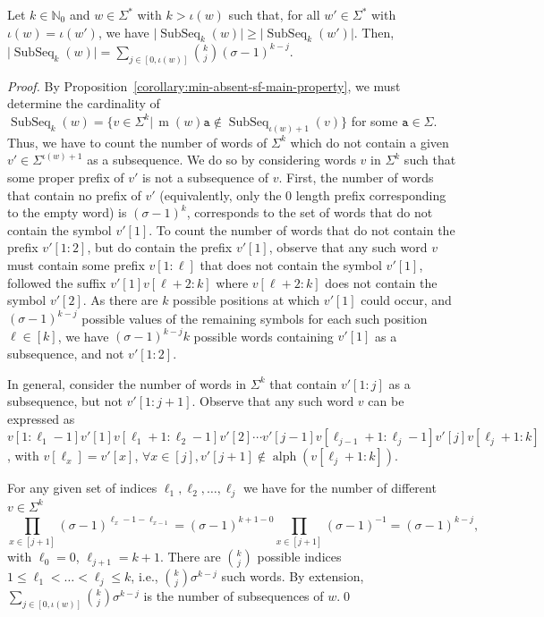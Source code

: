 \documentclass[runningheads,UKenglish,cleveref, autoref, thm-restate]{llncs}
\newcommand{\N}{\mathbb{N}}
\def\ta{\mathtt{a}}
\def\m{\operatorname{m}}
\DeclareMathOperator\ScatFact{SubSeq}
\DeclareMathOperator{\letters}{alph}
\newif\ifpaper
\begin{document}
\begin{proposition}
    \label{proposition:min-absent-sf-count-max-factors}
    Let $k\in\N_0$ and $w \in \Sigma^*$ with $k > \iota(w)$ such that, for all $w' \in \Sigma^*$ with $\iota(w) = \iota(w')$, we have $\vert \ScatFact_k(w) \vert \geq \vert \ScatFact_k(w') \vert$. Then,
    $\vert \ScatFact_k(w) \vert = \sum_{j \in [0, \iota(w)]} \binom{k}{j} (\sigma-1)^{k - j}.$
\end{proposition}
\ifpaper
\else
\begin{proof}
	By Proposition~\ref{corollary:min-absent-sf-main-property}, we must determine the cardinality of 
	$\ScatFact_k(w)=\{v\in\Sigma^k|\,\m(w)\ta\not\in\ScatFact_{\iota(w)+1}(v)\}$ for some $\ta \in \Sigma$. Thus, we have to count the number of words of $\Sigma^k$ which do not contain a given $v'\in\Sigma^{\iota(w)+1}$ as a subsequence. We do so by considering words $v$ in $\Sigma^k$ such that some proper prefix of $v'$ is not a subsequence of $v$.
	First, the number of words that contain no prefix of $v'$ (equivalently, only the $0$ length prefix corresponding to the empty word) is $(\sigma - 1)^k$, corresponds to the set of words that do not contain the symbol $v'[1]$. 
	To count the number of words that do not contain the prefix $v'[1: 2]$, but do contain the prefix $v'[1]$, observe that any such word $v$ must contain some prefix $v[1:\ell]$ that does not contain the symbol $v'[1]$, followed the suffix $v'[1] v[\ell + 2:k]$ where $v[\ell + 2: k]$ does not contain the symbol $v'[2]$.  As there are $k$ possible positions at which $v'[1]$ could occur, and $(\sigma - 1)^{k - j}$ possible values of the remaining symbols for each such position $\ell \in [k]$, we have $(\sigma - 1)^{k - j} k$ possible words containing $v'[1]$ as a subsequence, and not $v'[1: 2]$.
	
	In general, consider the number of words in $\Sigma^k$ that contain $v'[1: j]$ as a subsequence, but not $v'[1: j + 1]$. Observe that any such word $v$ can be expressed as $v[1: \ell_1 - 1] v'[1] v[\ell_1 + 1: \ell_2 - 1] v'[2] \cdots v'[j - 1] v[\ell_{j - 1} + 1: \ell_j - 1] v'[j] v[\ell_{j} + 1: k]$, with $v[\ell_{x}] = v'[x]$, $\forall x \in [j], v'[j+1]\not\in\letters(v[\ell_j+1:k])$.
	
	For any given set of indices $\ell_1, \ell_2, \dots, \ell_j$ we have for the number of different $v\in\Sigma^k$ 
	\[
	\prod_{x \in [j + 1]}(\sigma - 1)^{\ell_{x} - 1 - \ell_{x - 1}} = (\sigma - 1)^{k+1 - 0} \prod_{x \in [j + 1]} (\sigma-1)^{-1} = (\sigma - 1)^{k-j}, 
	\]
	with $\ell_0 = 0$, $\ell_{j + 1} = k+1$. 
	There are $\binom{k}{j}$ possible indices $ 1 \leq \ell_1 < \dots < \ell_{j} \leq k$, i.e., $\binom{k}{j} \sigma^{k - j}$ such words. By extension, $\sum_{j \in [0, 
		\iota(w)]} \binom{k}{j} \sigma^{k - j}$ is the number of subsequences of $w$.\qed
\end{proof}
\fi
\end{document}
